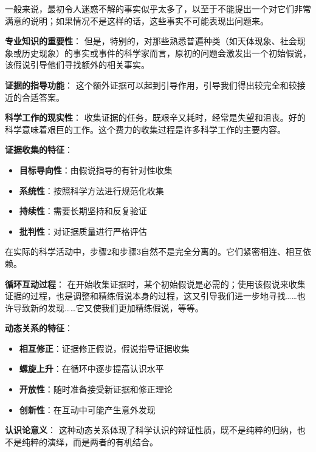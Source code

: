 \begin{theorembox}[title=证据收集的系统性特征]
一般来说，最初令人迷惑不解的事实似乎太多了，以至于不能提出一个对它们非常满意的说明；如果情况不是这样的话，这些事实不可能表现出问题来。

\textbf{专业知识的重要性}：
但是，特别的，对那些熟悉普遍种类（如天体现象、社会现象或历史现象）的事实或事件的科学家而言，原初的问题会激发出一个初始假说，该假说引导他们寻找额外的相关事实。

\textbf{证据的指导功能}：
这个额外证据可以起到引导作用，引导我们得出较完全和较接近的合适答案。

\textbf{科学工作的现实性}：
收集证据的任务，既艰辛又耗时，经常是失望和沮丧。好的科学意味着艰巨的工作。这个费力的收集过程是许多科学工作的主要内容。

\textbf{证据收集的特征}：
\begin{itemize}
\item \textbf{目标导向性}：由假说指导的有针对性收集
\item \textbf{系统性}：按照科学方法进行规范化收集
\item \textbf{持续性}：需要长期坚持和反复验证
\item \textbf{批判性}：对证据质量进行严格评估
\end{itemize}
\end{theorembox}

\begin{theorembox}[title=假说与证据收集的动态关系]
在实际的科学活动中，步骤2和步骤3自然不是完全分离的。它们紧密相连、相互依赖。

\textbf{循环互动过程}：
在开始收集证据时，某个初始假说是必需的；使用该假说来收集证据的过程，也是调整和精练假说本身的过程，这又引导我们进一步地寻找……也许导致新的发现……它又使我们更加精练假说，等等。

\textbf{动态关系的特征}：
\begin{itemize}
\item \textbf{相互修正}：证据修正假说，假说指导证据收集
\item \textbf{螺旋上升}：在循环中逐步提高认识水平
\item \textbf{开放性}：随时准备接受新证据和修正理论
\item \textbf{创新性}：在互动中可能产生意外发现
\end{itemize}

\textbf{认识论意义}：
这种动态关系体现了科学认识的辩证性质，既不是纯粹的归纳，也不是纯粹的演绎，而是两者的有机结合。
\end{theorembox}

